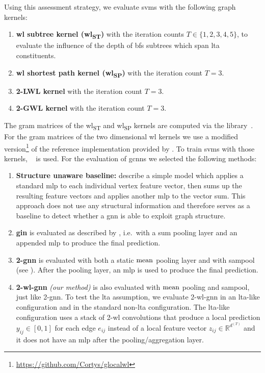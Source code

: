 Using this assessment strategy, we evaluate \acp{svm} with the following graph kernels:
\begin{enumerate}[label={\textbf{\arabic*.}},itemsep=2pt,parsep=2pt]
	\item \textbf{\ac{wl} subtree kernel (\acs{wl}\textsubscript{ST})} with the iteration counts $T \in \{ 1,2,3,4,5 \}$, to evaluate the influence of the depth of \ac{bfs} subtrees which span \ac{lta} constituents.
	\item \textbf{\ac{wl} shortest path kernel (\acs{wl}\textsubscript{SP})} with the iteration count $T = 3$.
	\item \textbf{2-LWL kernel} with the iteration count $T = 3$.
	\item \textbf{2-GWL kernel} with the iteration count $T = 3$.
\end{enumerate}
The gram matrices of the \acs{wl}\textsubscript{ST} and \acs{wl}\textsubscript{SP} kernels are computed via the  library~\cite{Siglidis2018}\cite{GK}.
For the gram matrices of the two dimensional \ac{wl} kernels we use a modified version\footnote{\url{https://github.com/Cortys/glocalwl}} of the reference implementation provided by \citet{Morris2017}.
To train \acp{svm} with those kernels, ~\cite{Pedregosa2011}\cite{SKL} is used.
For the evaluation of \acp{gcnn} we selected the following methods:
\begin{enumerate}[label={\textbf{\arabic*.}},itemsep=2pt,parsep=2pt]
	\item \textbf{Structure unaware baseline:}
		\citet{Errica2020} describe a simple model which applies a standard \ac{mlp} to each individual vertex feature vector, then sums up the resulting feature vectors and applies another \ac{mlp} to the vector sum.
		This approach does not use any structural information and therefore serves as a baseline to detect whether a \ac{gnn} is able to exploit graph structure.
	\item \textbf{\ac{gin}} is evaluated as described by \citet{Xu2018}, i.e.\ with a sum pooling layer and an appended \ac{mlp} to produce the final prediction.
	\item \textbf{2-\acs{gnn}} is evaluated with both a static $\operatorname{mean}$ pooling layer and with \ac{sampool} (see ).
		After the pooling layer, an \ac{mlp} is used to produce the final prediction.
	\item \textbf{2-\acs{wl}-\ac{gnn}} \textit{(our method)} is also evaluated with $\operatorname{mean}$ pooling and \ac{sampool}, just like 2-\ac{gnn}.
		To test the \ac{lta} assumption, we evaluate 2-\acs{wl}-\acs{gnn} in an \acs{lta}-like configuration and in the standard non-\acs{lta} configuration.
		The \acs{lta}-like configuration uses a stack of 2-\acs{wl} convolutions that produce a local prediction $y_{ij} \in [0, 1]$ for each edge $e_{ij}$ instead of a local feature vector $z_{ij} \in \mathbb{R}^{d^{(T)}}$ and it does not have an \ac{mlp} after the pooling/aggregation layer.
\end{enumerate}
